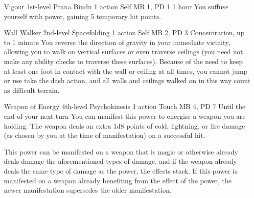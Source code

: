 \DndPowerHeader%
  {Vigour}
  {1st-level Prana Bindu}
  {1 action}
  {Self}
  {MB 1, PD 1}
  {1 hour}
You suffuse yourself with power,
gaining 5 temporary hit points.

\DndPowerHeader%
  {Wall Walker}
  {2nd-level Spacefolding}
  {1 action}
  {Self}
  {MB 2, PD 3}
  {Concentration, up to 1 minute}
  You reverse the direction of gravity in your immediate vicinity,
  allowing you to walk on vertical surfaces
  or even traverse ceilings
  (you need not make any ability checks to traverse these surfaces).
  Because of the need to keep at least one foot in contact
  with the wall or ceiling at all times,
  you cannot jump or use take the dash action,
  and all walls and ceilings walked on in this way count as
  difficult terrain.

\DndPowerHeader%
  {Weapon of Energy}
  {4th-level Psychokinesis}
  {1 action}
  {Touch}
  {MB 4, PD 7}
  {Until the end of your next turn}
  You can manifest this power to
  energise a weapon you are holding.
  The weapon deals an extra 1d8 points of cold,
  lightning, or fire damage
  (as chosen by you at the time of manifestation)
  on a successful hit.

  This power can be manifested on a weapon that
  is magic or otherwise already deals damage the
  aforementioned types of damage,
  and if the weapon already deals the same type of damage
  as the power,
  the effects stack.
  If this power is manifested on a weapon
  already benefiting from the effect of the power,
  the newer manifestation supersedes the older manifestation.